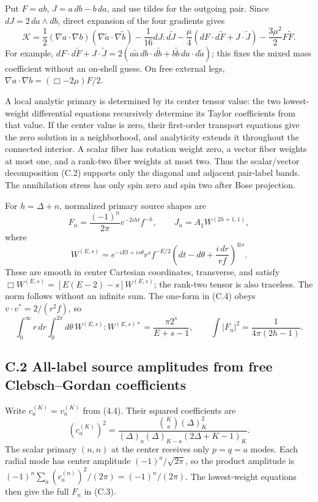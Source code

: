 \documentclass[a4paper,11pt]{article}
\numberwithin{equation}{section}
\begin{document}
Put \(F=ab\), \(J=a\,db-b\,da\), and use tildes for the outgoing pair. Since \(dJ=2\,da\wedge db\), direct expansion of the four gradients gives \[
\mathcal K=
\frac12(\nabla a\cdot\nabla b)
(\nabla\widetilde a\cdot\nabla\widetilde b)
-\frac1{16}dJ:d\widetilde J
-\frac{\mu}{4}(dF\cdot d\widetilde F+J\cdot\widetilde J)
-\frac{3\mu^2}{2}F\widetilde F .
\tag{C.2}
\] For example, \(dF\cdot d\widetilde F+J\cdot\widetilde J =2(a\widetilde a\,db\cdot d\widetilde b +b\widetilde b\,da\cdot d\widetilde a)\); this fixes the mixed mass coefficient without an on-shell guess. On free external legs, \(\nabla a\cdot\nabla b=(\Box-2\mu)F/2\).

A local analytic primary is determined by its center tensor value: the two lowest-weight differential equations recursively determine its Taylor coefficients from that value. If the center value is zero, their first-order transport equations give the zero solution in a neighborhood, and analyticity extends it throughout the connected interior. A scalar fiber has rotation weight zero, a vector fiber weights at most one, and a rank-two fiber weights at most two. Thus the scalar/vector decomposition (C.2) supports only the diagonal and adjacent pair-label bands. The annihilation stress has only spin zero and spin two after Bose projection.

For \(h=\Delta+n\), normalized primary source shapes are \[
F_n=\frac{(-1)^n}{2\pi}e^{-2iht}f^{-h},
\qquad
J_n=A_1W^{(2h+1,1)},
\tag{C.3}
\] where \[
W^{(E,s)}
=e^{-iEt+is\theta}r^sf^{-E/2}
\left(dt-d\theta+\frac{i\,dr}{rf}\right)^{\otimes s}.
\tag{C.4}
\] These are smooth in center Cartesian coordinates, transverse, and satisfy \(\Box W^{(E,s)}=[E(E-2)-s]W^{(E,s)}\); the rank-two tensor is also traceless. The norm follows without an infinite sum. The one-form in (C.4) obeys \(v\cdot v^*=2/(r^2f)\), so \[
\int_0^\infty r\,dr\int_0^{2\pi}d\theta\,
W^{(E,s)}:W^{(E,s)*}
=\frac{\pi2^s}{E+s-1},
\qquad
\int|F_n|^2=\frac1{4\pi(2h-1)}.
\tag{C.5}
\]

\hypertarget{c.2-all-label-source-amplitudes-from-free-clebschgordan-coefficients}{%
\subsection{C.2 All-label source amplitudes from free Clebsch--Gordan coefficients}\label{c.2-all-label-source-amplitudes-from-free-clebschgordan-coefficients}}

Write \(c_a^{(K)}=v_a^{(K)}\) from (4.4). Their squared coefficients are \[
(c_a^{(K)})^2=
\frac{\binom Ka(\Delta)_K^2}
{(\Delta)_a(\Delta)_{K-a}(2\Delta+K-1)_K}.
\tag{C.6}
\] The scalar primary \((n,n)\) at the center receives only \(p=q=a\) modes. Each radial mode has center amplitude \((-1)^a/\sqrt{2\pi}\), so the product amplitude is \((-1)^n\sum_a(c_a^{(n)})^2/(2\pi)=(-1)^n/(2\pi)\). The lowest-weight equations then give the full \(F_n\) in (C.3).
\end{document}
